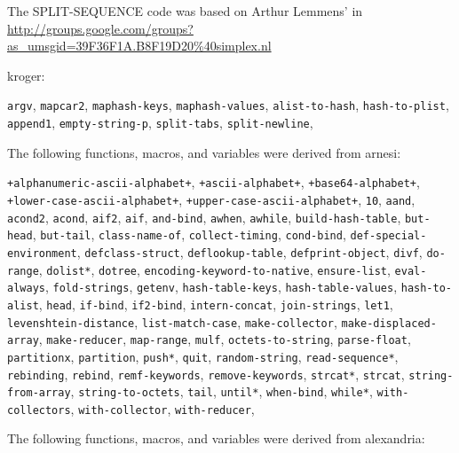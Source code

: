 
 

The SPLIT-SEQUENCE code was based on Arthur Lemmens' in
\url{http://groups.google.com/groups?as_umsgid=39F36F1A.B8F19D20%40simplex.nl}

kroger:

\texttt{argv}, 
\texttt{mapcar2}, 
\texttt{maphash-keys}, 
\texttt{maphash-values}, 
\texttt{alist-to-hash}, 
\texttt{hash-to-plist}, 
\texttt{append1}, 
\texttt{empty-string-p}, 
\texttt{split-tabs}, 
\texttt{split-newline}, 

The following functions, macros, and variables were derived from
arnesi:

\texttt{+alphanumeric-ascii-alphabet+}, 
\texttt{+ascii-alphabet+}, 
\texttt{+base64-alphabet+}, 
\texttt{+lower-case-ascii-alphabet+}, 
\texttt{+upper-case-ascii-alphabet+}, 
\texttt{10}, 
\texttt{aand}, 
\texttt{acond2}, 
\texttt{acond}, 
\texttt{aif2}, 
\texttt{aif}, 
\texttt{and-bind}, 
\texttt{awhen}, 
\texttt{awhile}, 
\texttt{build-hash-table}, 
\texttt{but-head}, 
\texttt{but-tail}, 
\texttt{class-name-of}, 
\texttt{collect-timing}, 
\texttt{cond-bind}, 
\texttt{def-special-environment}, 
\texttt{defclass-struct}, 
\texttt{deflookup-table}, 
\texttt{defprint-object}, 
\texttt{divf}, 
\texttt{do-range}, 
\texttt{dolist*}, 
\texttt{dotree}, 
\texttt{encoding-keyword-to-native}, 
\texttt{ensure-list}, 
\texttt{eval-always}, 
\texttt{fold-strings}, 
\texttt{getenv}, 
\texttt{hash-table-keys}, 
\texttt{hash-table-values}, 
\texttt{hash-to-alist}, 
\texttt{head}, 
\texttt{if-bind}, 
\texttt{if2-bind}, 
\texttt{intern-concat}, 
\texttt{join-strings}, 
\texttt{let1}, 
\texttt{levenshtein-distance}, 
\texttt{list-match-case}, 
\texttt{make-collector}, 
\texttt{make-displaced-array}, 
\texttt{make-reducer}, 
\texttt{map-range}, 
\texttt{mulf}, 
\texttt{octets-to-string}, 
\texttt{parse-float}, 
\texttt{partitionx}, 
\texttt{partition}, 
\texttt{push*}, 
\texttt{quit}, 
\texttt{random-string}, 
\texttt{read-sequence*}, 
\texttt{rebinding}, 
\texttt{rebind}, 
\texttt{remf-keywords}, 
\texttt{remove-keywords}, 
\texttt{strcat*}, 
\texttt{strcat}, 
\texttt{string-from-array}, 
\texttt{string-to-octets}, 
\texttt{tail}, 
\texttt{until*}, 
\texttt{when-bind}, 
\texttt{while*}, 
\texttt{with-collectors}, 
\texttt{with-collector}, 
\texttt{with-reducer}, 

The following functions, macros, and variables were derived from
alexandria:

